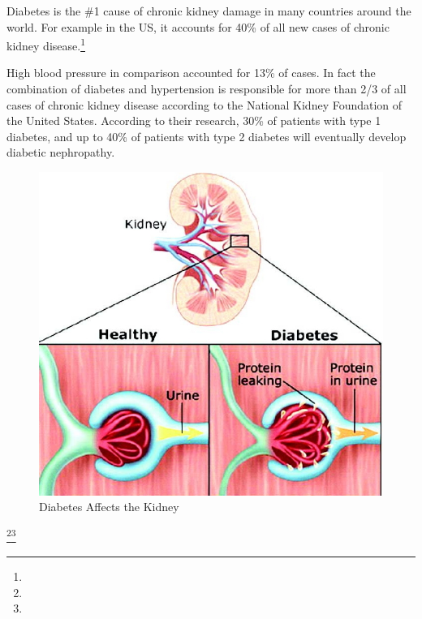 
Diabetes is the \#1 cause of chronic kidney damage in many countries around the world. For example in the US, it accounts for 40\% of all new cases of chronic kidney disease.\footnote{}

 High blood pressure in comparison accounted for 13\% of cases. In fact the combination of diabetes and hypertension is responsible for more than 2/3 of all cases of chronic kidney disease according to the National Kidney Foundation of the United States. According to their research, 30\% of patients with type 1 diabetes, and up to 40\% of patients with type 2 diabetes will eventually develop diabetic nephropathy.

\begin{figure}
\caption{Diabetes Affects the Kidney}
\includegraphics{images/048.jpg}
\end{figure}

\footnote{}\footnote{}

